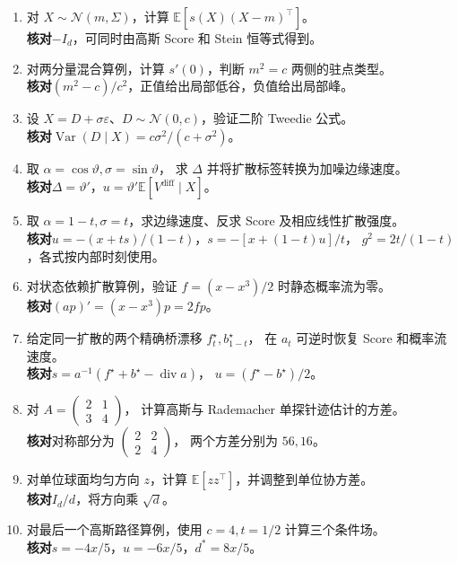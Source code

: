 \begin{enumerate}
 \item 对 \(X\sim\mathcal N(m,\Sigma)\)，计算 \(\mathbb E[s(X)(X-m)^\top]\)。\\
 \textbf{核对}\quad \(-I_d\)，可同时由高斯 Score 和 Stein 恒等式得到。
 \item 对两分量混合算例，计算 \(s'(0)\)，判断 \(m^2=c\) 两侧的驻点类型。\\
 \textbf{核对}\quad \((m^2-c)/c^2\)，正值给出局部低谷，负值给出局部峰。
 \item 设 \(X=D+\sigma\varepsilon\)、\(D\sim\mathcal N(0,c)\)，验证二阶 Tweedie 公式。\\
 \textbf{核对}\quad \(\operatorname{Var}(D\mid X)=c\sigma^2/(c+\sigma^2)\)。
 \item 取 \(\alpha=\cos\vartheta,\sigma=\sin\vartheta\)，
 求 \(\Delta\) 并将扩散标签转换为加噪边缘速度。\\
 \textbf{核对}\quad \(\Delta=\vartheta'\)，\(u=\vartheta'\mathbb E[V^{\mathrm{diff}}\mid X]\)。
 \item 取 \(\alpha=1-t,\sigma=t\)，求边缘速度、反求 Score 及相应线性扩散强度。\\
 \textbf{核对}\quad \(u=-(x+ts)/(1-t)\)，\(s=-[x+(1-t)u]/t\)，
 \(g^2=2t/(1-t)\)，各式按内部时刻使用。
 \item 对状态依赖扩散算例，验证 \(f=(x-x^3)/2\) 时静态概率流为零。\\
 \textbf{核对}\quad \((ap)'=(x-x^3)p=2fp\)。
 \item 给定同一扩散的两个精确桥漂移 \(f_t^\star,b_{1-t}^\star\)，
 在 \(a_t\) 可逆时恢复 Score 和概率流速度。\\
 \textbf{核对}\quad \(s=a^{-1}(f^\star+b^\star-\operatorname{div}a)\)，
 \(u=(f^\star-b^\star)/2\)。
 \item 对 \(A=\begin{pmatrix}2&1\\3&4\end{pmatrix}\)，
 计算高斯与 Rademacher 单探针迹估计的方差。\\
 \textbf{核对}\quad 对称部分为 \(\begin{pmatrix}2&2\\2&4\end{pmatrix}\)，
 两个方差分别为 \(56,16\)。
 \item 对单位球面均匀方向 \(z\)，计算 \(\mathbb E[zz^\top]\)，并调整到单位协方差。\\
 \textbf{核对}\quad \(I_d/d\)，将方向乘 \(\sqrt d\)。
 \item 对最后一个高斯路径算例，使用 \(c=4,t=1/2\) 计算三个条件场。\\
 \textbf{核对}\quad \(s=-4x/5\)，\(u=-6x/5\)，\(d^*=8x/5\)。
\end{enumerate}
